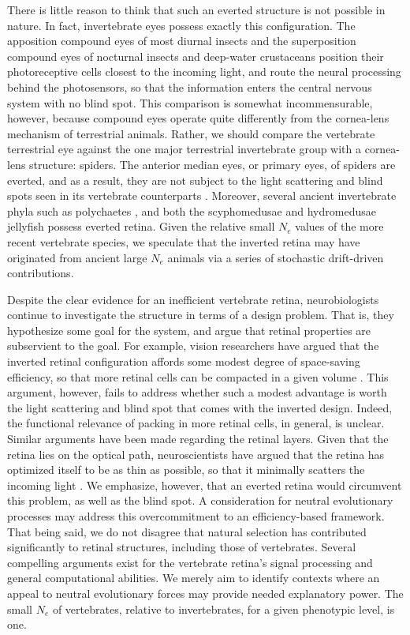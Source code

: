 \documentclass[twocolumn]{article}
\begin{document}
There is little reason to think that such an everted structure is not possible in nature. In fact, invertebrate eyes possess exactly this configuration. The apposition compound eyes of most diurnal insects and the superposition compound eyes of nocturnal insects and deep-water crustaceans position their photoreceptive cells closest to the incoming light, and route the neural processing behind the photosensors, so that the information enters the central nervous system with no blind spot. This comparison is somewhat incommensurable, however, because compound eyes operate quite differently from the cornea-lens mechanism of terrestrial animals. Rather, we should compare the vertebrate terrestrial eye against the one major terrestrial invertebrate group with a cornea-lens structure: spiders. The anterior median eyes, or primary eyes, of spiders are everted, and as a result, they are not subject to the light scattering and blind spots seen in its vertebrate counterparts \cite{land_nilsson_2012, norgaard_2008}. Moreover, several ancient invertebrate phyla such as polychaetes \cite{richter_2010}, and both the scyphomedusae and hydromedusae jellyfish \cite{garm_2010} possess everted retina. Given the relative small $N_e$ values of the more recent vertebrate species, we speculate that the inverted retina may have originated from ancient large $N_e$ animals via a series of stochastic drift-driven contributions.

Despite the clear evidence for an inefficient vertebrate retina, neurobiologists continue to investigate the structure in terms of a design problem. That is, they hypothesize some goal for the system, and argue that retinal properties are subservient to the goal. For example, vision researchers have argued that the inverted retinal configuration affords some modest degree of space-saving efficiency, so that more retinal cells can be compacted in a given volume \cite{kroger_2009}. This argument, however, fails to address whether such a modest advantage is worth the light scattering and blind spot that comes with the inverted design. Indeed, the functional relevance of packing in more retinal cells, in general, is unclear. Similar arguments have been made regarding the retinal layers. Given that the retina lies on the optical path, neuroscientists have argued that the retina has optimized itself to be as thin as possible, so that it minimally scatters the incoming light \cite{sterling_laughlin_principles}. We emphasize, however, that an everted retina would circumvent this problem, as well as the blind spot. A consideration for neutral evolutionary processes may address this overcommitment to an efficiency-based framework. That being said, we do not disagree that natural selection has contributed significantly to retinal structures, including those of vertebrates. Several compelling arguments exist for the vertebrate retina's signal processing and general computational abilities. We merely aim to identify contexts where an appeal to neutral evolutionary forces may provide needed explanatory power. The small $N_e$ of vertebrates, relative to invertebrates, for a given phenotypic level, is one. 
\end{document}
